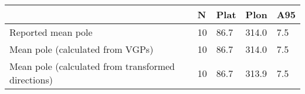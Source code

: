 \begin{tabular}{lllll}
\toprule
{} &   N &  Plat &   Plon &  A95 \\
\midrule
Reported mean pole                                 &  10 &  86.7 &  314.0 &  7.5 \\
Mean pole (calculated from VGPs)                   &  10 &  86.7 &  314.0 &  7.5 \\
Mean pole (calculated from transformed directions) &  10 &  86.7 &  313.9 &  7.5 \\
\bottomrule
\end{tabular}
